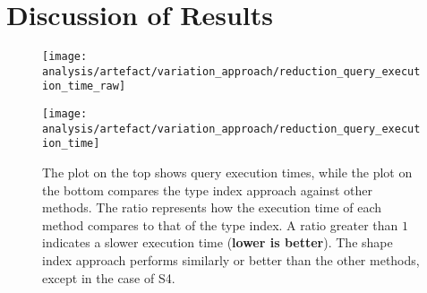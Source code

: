 \section{Discussion of Results}\label{sec:result}


\begin{figure}
    \centering
    \begin{minipage}[t]{0.43\linewidth}
        \centering
        \texttt{[image: analysis/artefact/variation\_approach/reduction\_query\_execution\_time\_raw]}
    \end{minipage}
    \hspace{0.05\textwidth}
    \begin{minipage}[t]{0.43\linewidth}
        \centering
        \texttt{[image: analysis/artefact/variation\_approach/reduction\_query\_execution\_time]}
    \end{minipage}

    \caption{
    The plot on the top shows query execution times, while the plot on the bottom compares the type index approach against other methods.
    The ratio represents how the execution time of each method compares to that of the type index. A ratio greater than $1$ indicates a slower execution time (\textbf{lower is better}).
    The shape index approach performs similarly or better than the other methods, except in the case of S4.
    }
    \label{fig:compApproach}
\end{figure}



